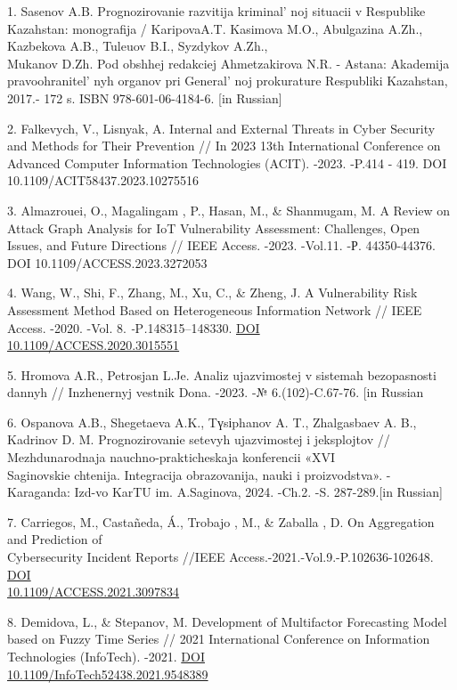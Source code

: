 \begin{references}
1. Sasenov A.B. Prognozirovanie razvitija kriminal' noj
situacii v Respublike Kazahstan: monografija / KaripovaA.T. Kasimova M.O.,
Abulgazina A.Zh., Kazbekova A.B., Tuleuov B.I., Syzdykov A.Zh., \\Mukanov
D.Zh. Pod obshhej redakciej Ahmetzakirova N.R. - Astana: Akademija
pravoohranitel' nyh organov pri
General' noj prokurature Respubliki Kazahstan, 2017.- 172
s. ISBN 978-601-06-4184-6. {[}in Russian{]}

2. Falkevych, V., Lisnyak, A. Internal and External Threats in Cyber
Security and Methods for Their Prevention // In 2023 13th International
Conference on Advanced Computer Information Technologies (ACIT). -2023.
-P.414 - 419. DOI 10.1109/ACIT58437.2023.10275516

3. Almazrouei, O., Magalingam , P., Hasan, M., \& Shanmugam, M. A Review
on Attack Graph Analysis for IoT Vulnerability Assessment: Challenges,
Open Issues, and Future Directions // IEEE Access. -2023. -Vol.11. -Р.
44350-44376. DOI 10.1109/ACCESS.2023.3272053

4. Wang, W., Shi, F., Zhang, M., Xu, C., \& Zheng, J. A Vulnerability
Risk Assessment Method Based on Heterogeneous Information Network //
IEEE Access. -2020. -Vol. 8. \emph{-}P\emph{.}148315--148330.
\href{https://doi.org/10.1109/ACCESS.2020.3015551}{DOI\\
10.1109/ACCESS.2020.3015551}

5. Hromova A.R., Petrosjan L.Je. Analiz ujazvimostej v sistemah
bezopasnosti dannyh // Inzhenernyj vestnik Dona. -2023. -№
6.(102)-C.67-76. {[}in Russian

6. Ospanova A.B., Shegetaeva A.K., Tүsіphanov A. T., Zhalgasbaev A. B.,
Kadrinov D. M. Prognozirovanie setevyh ujazvimostej i jeksplojtov //
Mezhdunarodnaja nauchno-prakticheskaja konferencii «XVI \\Saginovskie
chtenija. Integracija obrazovanija, nauki i proizvodstva». - Karaganda:
Izd-vo KarTU im. A.Saginova, 2024. -Ch.2. -S. 287-289.{[}in Russian{]}

7. Carriegos, M., Castañeda, Á., Trobajo , M., \& Zaballa , D. On
Aggregation and Prediction of \\Cybersecurity Incident Reports //IEEE
Access.-2021.-Vol.9.-P.102636-102648.
\href{https://doi.org/10.1109/ACCESS.2021.3097834}{DOI\\
10.1109/ACCESS.2021.3097834}

8. Demidova, L., \& Stepanov, M. Development of Multifactor Forecasting
Model based on Fuzzy Time Series // 2021 International Conference on
Information Technologies (InfoTech). -2021.
\href{https://doi.org/10.1109/InfoTech52438.2021.9548389}{DOI\\
10.1109/InfoTech52438.2021.9548389}


\end{references}
